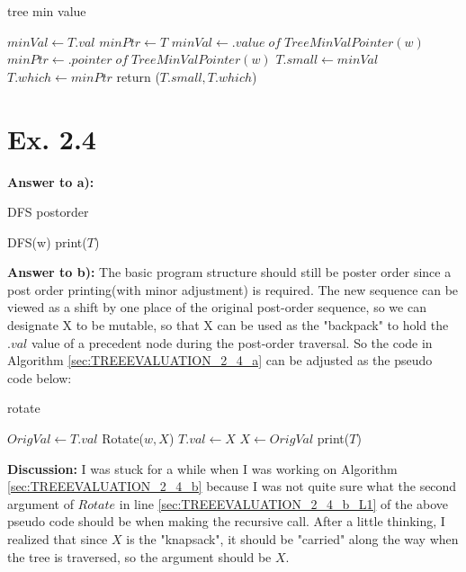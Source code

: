 \documentclass[a4paper,11pt]{article}
\theoremstyle{mytheor}
\begin{document}
\begin{algorithm}[H]
\caption{tree min value}\label{sec:TREEEVALUATION_2_3_b}
\begin{algorithmic}[1]
  \State $minVal \gets T.val$
  \State $minPtr \gets T$
      \State $minVal \gets .value\;of\;TreeMinValPointer(w)$
      \State $minPtr \gets .pointer\;of\;TreeMinValPointer(w)$
    \EndIf
  \EndFor
  \State $T.small \gets minVal$
  \State $T.which \gets minPtr$
  \State return ($T.small, T.which$)   
\EndFunction
\end{algorithmic}
\end{algorithm}

\vspace{1.2in}

\section*{Ex. 2.4}
\noindent\textbf{Answer to a):} 
\begin{algorithm}[H]
\caption{DFS postorder}\label{sec:TREEEVALUATION_2_4_a}
\begin{algorithmic}[1]
    \State DFS(w)
  \EndFor
  \State print($T$)
\EndProcedure
\end{algorithmic}
\end{algorithm}

\vspace{1.2in}

\noindent\textbf{Answer to b):} The basic program structure should still be poster order since a post order printing(with minor adjustment) is required. The new sequence can be viewed as a shift by one place of the original post-order sequence, so we can designate X to be mutable, so that X can be used as the "backpack" to hold the $.val$ value of a precedent node during the post-order traversal. So the code in Algorithm \ref{sec:TREEEVALUATION_2_4_a} can be adjusted as the pseudo code below:
\begin{algorithm}[H]
\caption{rotate}\label{sec:TREEEVALUATION_2_4_b}
\begin{algorithmic}[1]
  \State $OrigVal \gets T.val$
    \State Rotate($w, X$) \label{sec:TREEEVALUATION_2_4_b_L1}
  \EndFor
  \State $T.val \gets X$
  \State $X \gets OrigVal$
  \State print($T$)
\EndProcedure
\end{algorithmic}
\end{algorithm}
\noindent\textbf{Discussion:} I was stuck for a while when I was working on Algorithm \ref{sec:TREEEVALUATION_2_4_b} because I was not quite sure what the second argument of $Rotate$ in line \ref{sec:TREEEVALUATION_2_4_b_L1} of the above pseudo code should be when making the recursive call. After a little thinking, I realized that since $X$ is the "knapsack", it should be "carried" along the way when the tree is traversed, so the argument should be $X$.
\end{document}
